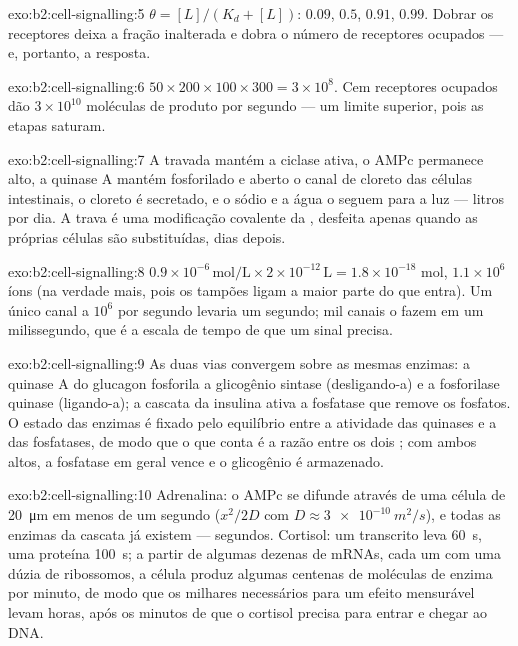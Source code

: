 \begin{solution}{exo:b2:cell-signalling:5}
$\theta = [L]/(K_d + [L])$: $0.09$, $0.5$, $0.91$, $0.99$. Dobrar os
receptores deixa a fração inalterada e dobra o número de receptores
ocupados --- e, portanto, a resposta.
\end{solution}

\begin{solution}{exo:b2:cell-signalling:6}
$50\times 200\times 100\times 300 = 3\times 10^{8}$. Cem receptores
ocupados dão $3\times 10^{10}$ moléculas de produto por segundo --- um
limite superior, pois as etapas saturam.
\end{solution}

\begin{solution}{exo:b2:cell-signalling:7}
A  travada mantém a ciclase ativa, o AMPc permanece alto, a
quinase A mantém fosforilado e aberto o canal de cloreto das células
intestinais, o cloreto é secretado, e o sódio e a água o seguem para a
luz --- litros por dia. A trava é uma modificação covalente da , desfeita apenas quando as próprias células são substituídas, dias
depois.
\end{solution}

\begin{solution}{exo:b2:cell-signalling:8}
$0.9\times 10^{-6}\,\text{mol/L}\times 2\times 10^{-12}\,\text{L} =
1.8\times 10^{-18}$ mol, $1.1\times 10^{6}$ íons (na verdade mais, pois
os tampões ligam a maior parte do que entra). Um único canal a $10^{6}$
por segundo levaria um segundo; mil canais o fazem em um milissegundo,
que é a escala de tempo de que um sinal precisa.
\end{solution}

\begin{solution}{exo:b2:cell-signalling:9}
As duas vias convergem sobre as mesmas enzimas: a quinase A do glucagon
fosforila a glicogênio sintase (desligando-a) e a fosforilase quinase
(ligando-a); a cascata da insulina ativa a fosfatase que remove os
fosfatos. O estado das enzimas é fixado pelo equilíbrio entre a
atividade das quinases e a das fosfatases, de modo que o que conta é a
razão entre os dois ; com ambos altos, a fosfatase em geral
vence e o glicogênio é armazenado.
\end{solution}

\begin{solution}{exo:b2:cell-signalling:10}
Adrenalina: o AMPc se difunde através de uma célula de
\qty{20}{\micro m} em menos de um segundo ($x^{2}/2D$ com
$D \approx \qty{3e-10}{m^2/s}$), e todas as enzimas da cascata já
existem --- segundos. Cortisol: um transcrito leva \qty{60}{s}, uma
proteína \qty{100}{s}; a partir de algumas dezenas de mRNAs, cada um com
uma dúzia de ribossomos, a célula produz algumas centenas de moléculas
de enzima por minuto, de modo que os milhares necessários para um efeito
mensurável levam horas, após os minutos de que o cortisol precisa para
entrar e chegar ao DNA.
\end{solution}

